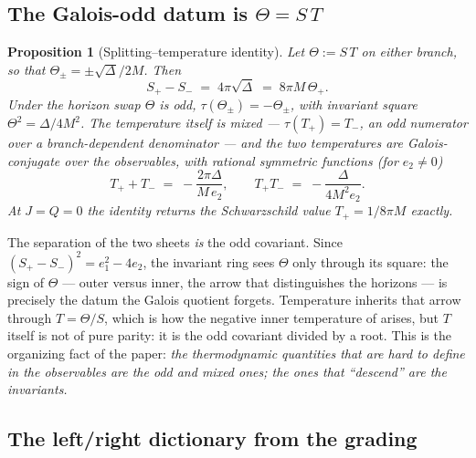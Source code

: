 \documentclass[11pt]{article}
\newtheorem{proposition}[theorem]{Proposition}
\theoremstyle{definition}
\theoremstyle{remark}
\newcommand{\disc}{\Delta}
\begin{document}
\subsection{The Galois-odd datum is $\Theta=S\,T$}

\begin{proposition}[Splitting--temperature identity]
\label{prop:splitting}
Let $\Theta:=S\,T$ on either branch, so that $\Theta_\pm=\pm\sqrt{\disc}/2M$.
Then
\[
S_+ - S_- \;=\; 4\pi\sqrt{\disc}\;=\;8\pi M\,\Theta_+ .
\]
Under the horizon swap $\Theta$ is odd, $\tau(\Theta_\pm)=-\Theta_\pm$, with
invariant square $\Theta^2=\disc/4M^2$. The temperature itself is mixed ---
$\tau(T_+)=T_-$, an odd numerator over a branch-dependent denominator --- and
the two temperatures are Galois-conjugate over the observables, with rational
symmetric functions (for $e_2\neq0$)
\[
T_+ + T_- \;=\; -\frac{2\pi\disc}{M\,e_2},\qquad
T_+ T_- \;=\; -\frac{\disc}{4M^2 e_2}.
\]
At $J=Q=0$ the identity returns the Schwarzschild value $T_+=1/8\pi M$
exactly.
\end{proposition}

The separation of the two sheets \emph{is} the odd covariant. Since
$(S_+-S_-)^2=e_1^2-4e_2$, the invariant ring sees $\Theta$ only through its
square: the sign of $\Theta$ --- outer versus inner, the arrow that
distinguishes the horizons --- is precisely the datum the Galois quotient
forgets. Temperature inherits that arrow through $T=\Theta/S$, which is how
the negative inner temperature of \cite{CGLP2018} arises, but $T$ itself is
not of pure parity: it is the odd covariant divided by a root. This is the
organizing fact of the paper: \emph{the thermodynamic quantities that are
hard to define in the observables are the odd and mixed ones; the ones that
``descend'' are the invariants.}

\subsection{The left/right dictionary from the grading}
\label{sec:dictionary}
\end{document}
